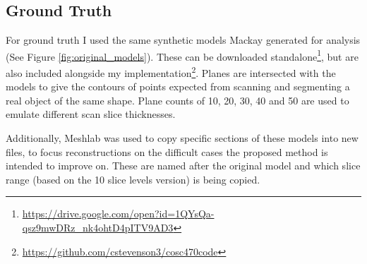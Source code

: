 \documentclass[11p, titlepage]{article}
\begin{document}
\subsection{Ground Truth}

For ground truth I used the same synthetic models Mackay generated for analysis (See Figure \ref{fig:original_models}). These can be downloaded standalone\footnote{\url{https://drive.google.com/open?id=1QYsQa-qsz9mwDRz_nk4ohtD4pITV9AD3}}, but are also included alongside my implementation\footnote{\url{https://github.com/cstevenson3/cosc470code}}. Planes are intersected with the models to give the contours of points expected from scanning and segmenting a real object of the same shape. Plane counts of 10, 20, 30, 40 and 50 are used to emulate different scan slice thicknesses.

Additionally, Meshlab was used to copy specific sections of these models into new files, to focus reconstructions on the difficult cases the proposed method is intended to improve on. These are named after the original model and which slice range (based on the 10 slice levels version) is being copied.
\end{document}
